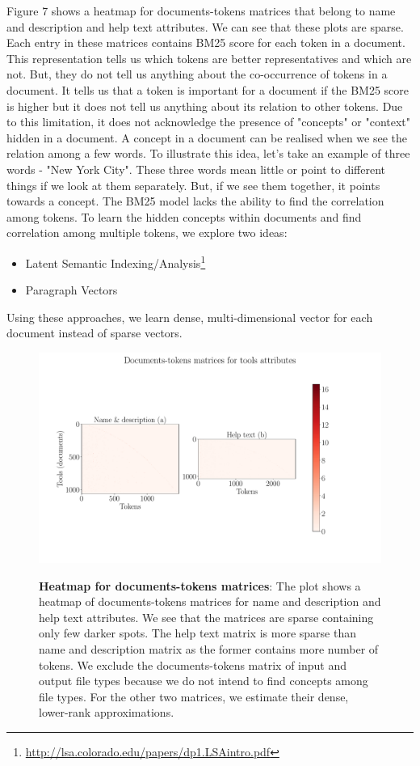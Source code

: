 Figure 7 shows a heatmap for documents-tokens matrices that belong to name and description and help text attributes. We can see that these plots are sparse. Each entry in these matrices contains BM25 score for each token in a document. This representation tells us which tokens are better representatives and which are not. But, they do not tell us anything about the co-occurrence of tokens in a document. It tells us that a token is important for a document if the BM25 score is higher but it does not tell us anything about its relation to other tokens. Due to this limitation, it does not acknowledge the presence of "concepts" or "context" hidden in a document. A concept in a document can be realised when we see the relation among a few words. To illustrate this idea, let's take an example of three words - "New York City". These three words mean little or point to different things if we look at them separately. But, if we see them together, it points towards a concept. The BM25 model lacks the ability to find the correlation among tokens. To learn the hidden concepts within documents and find correlation among multiple tokens, we explore two ideas:
\begin{itemize}
\item Latent Semantic Indexing/Analysis\footnote{\url{http://lsa.colorado.edu/papers/dp1.LSAintro.pdf}}
\item Paragraph Vectors
\end{itemize}

Using these approaches, we learn dense, multi-dimensional vector for each document instead of sparse vectors. 

\begin{figure}[h]
\begin{centering}
    {\includegraphics[scale=0.4]{figures/Document_tokens_full_rank.pdf}}
    \caption[Heatmap for documents-tokens matrices]{\textbf{Heatmap for documents-tokens matrices}: The plot shows a heatmap of documents-tokens matrices for name and description and help text attributes. We see that the matrices are sparse containing only few darker spots. The help text matrix is more sparse than name and description matrix as the former contains more number of tokens. We exclude the documents-tokens matrix of input and output file types because we do not intend to find concepts among file types. For the other two matrices, we estimate their dense, lower-rank approximations.}
\end{centering}
\end{figure}

